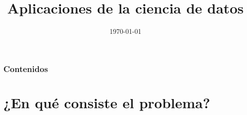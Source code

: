 \documentclass[8pt]{beamer}
\title[Ciencia de datos]{Aplicaciones de la ciencia de datos} %
\author[@ncordon \and fdavidcl \and @M42] %
{\texorpdfstring{
    \begin{columns}
      \column{.25\linewidth}
      \centering
      Ignacio Cordón\\
      \href{http://www.github.com/ncordon}{@ncordon}
      \column{.25\linewidth}
      \centering
      David Charte\\
      \href{http://www.github.com/fdavidcl}{@fdavidcl}
      \column{.25\linewidth}
      \centering
      Mario Román\\
      \href{http://www.github.com/M42}{@M42}
    \end{columns}
}{Ignacio Cordón \and David Charte \and Mario Román}}
\institute[UGR] %
{
  Universidad de Granada \\ %
  \medskip
}
\date{\today} %
\begin{document}
\begin{frame}
\titlepage %
\end{frame}

\begin{frame}
  \frametitle{Contenidos} %
  \tableofcontents
\end{frame}





\section{¿En qué consiste el problema?}
\end{document}
